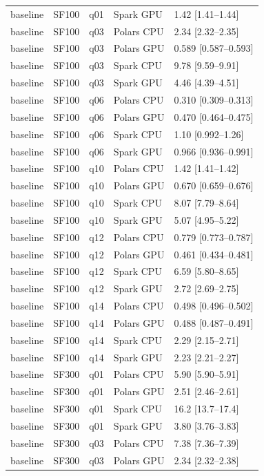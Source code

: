 \begin{longtable}{lllll}
baseline & SF100 & q01 & Spark GPU & 1.42 [1.41--1.44] \\
baseline & SF100 & q03 & Polars CPU & 2.34 [2.32--2.35] \\
baseline & SF100 & q03 & Polars GPU & 0.589 [0.587--0.593] \\
baseline & SF100 & q03 & Spark CPU & 9.78 [9.59--9.91] \\
baseline & SF100 & q03 & Spark GPU & 4.46 [4.39--4.51] \\
baseline & SF100 & q06 & Polars CPU & 0.310 [0.309--0.313] \\
baseline & SF100 & q06 & Polars GPU & 0.470 [0.464--0.475] \\
baseline & SF100 & q06 & Spark CPU & 1.10 [0.992--1.26] \\
baseline & SF100 & q06 & Spark GPU & 0.966 [0.936--0.991] \\
baseline & SF100 & q10 & Polars CPU & 1.42 [1.41--1.42] \\
baseline & SF100 & q10 & Polars GPU & 0.670 [0.659--0.676] \\
baseline & SF100 & q10 & Spark CPU & 8.07 [7.79--8.64] \\
baseline & SF100 & q10 & Spark GPU & 5.07 [4.95--5.22] \\
baseline & SF100 & q12 & Polars CPU & 0.779 [0.773--0.787] \\
baseline & SF100 & q12 & Polars GPU & 0.461 [0.434--0.481] \\
baseline & SF100 & q12 & Spark CPU & 6.59 [5.80--8.65] \\
baseline & SF100 & q12 & Spark GPU & 2.72 [2.69--2.75] \\
baseline & SF100 & q14 & Polars CPU & 0.498 [0.496--0.502] \\
baseline & SF100 & q14 & Polars GPU & 0.488 [0.487--0.491] \\
baseline & SF100 & q14 & Spark CPU & 2.29 [2.15--2.71] \\
baseline & SF100 & q14 & Spark GPU & 2.23 [2.21--2.27] \\
baseline & SF300 & q01 & Polars CPU & 5.90 [5.90--5.91] \\
baseline & SF300 & q01 & Polars GPU & 2.51 [2.46--2.61] \\
baseline & SF300 & q01 & Spark CPU & 16.2 [13.7--17.4] \\
baseline & SF300 & q01 & Spark GPU & 3.80 [3.76--3.83] \\
baseline & SF300 & q03 & Polars CPU & 7.38 [7.36--7.39] \\
baseline & SF300 & q03 & Polars GPU & 2.34 [2.32--2.38] \\

\end{longtable}
